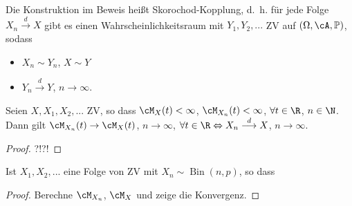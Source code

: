 \marginpar{\textcolor{red}{Vorlesung 28}}

\begin{bem1}
	Die Konstruktion im Beweis heißt Skorochod-Kopplung, \mbox{d. h.} für jede Folge $X_n \overset{d}{\longrightarrow} X$ gibt es einen Wahrscheinlichkeitsraum mit $Y_1,Y_2,...$ ZV auf $(\Omega, \cA, \mathbb{P})$, sodass 
	\begin{itemize}
		\item $X_n \sim Y_n$, $X \sim Y$
		\item $Y_n \overset{d}{\longrightarrow} Y$, $n \to \infty$.
	\end{itemize}
\end{bem1}

\begin{satz}
	Seien $X,X_1,X_2,...$ ZV, so dass $ \cM_X(t) < \infty$, $\cM_{X_n}(t) < \infty$, $\forall t \in \R$, $n \in \N$. Dann gilt $\cM_{X_n}(t) \to \cM_X(t)$, $n \to \infty$, $\forall t \in \R \Leftrightarrow X_n \overset{d}{\longrightarrow} X$, $n \to \infty$.
\end{satz}

\begin{proof}
	?!?!
\end{proof}

\begin{satz}
	Ist $X_1,X_2,...$ eine Folge von ZV mit $X_n \sim \operatorname{Bin}(n,p)$, so dass 
\end{satz}

\begin{proof}
	Berechne $\cM_{X_n}$, $\cM_X$ und zeige die Konvergenz.
\end{proof}

